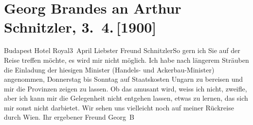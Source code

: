 

         
         \renewcommand{\erwaehntePersonen}{Personen: Georg Brandes, Ignác Darányi, Sandór Hegedüs}
         \renewcommand{\erwaehnteOrte}{Orte: Budapest, Hotel Royal, Ungarn, Wien}
         \renewcommand{\erwaehnteWerke}{}
               \section[Georg Brandes an Arthur Schnitzler, 3. 4. {[}1900{]}]{ Georg Brandes an Arthur Schnitzler, 3. 4. {[}1900{]}}\nopagebreak{}\rehead{ }\begin{ledgroupsized}[t]{13cm}\normalsize\beginnumbering{} \toendnotes[C]{\smallbreak\pagebreak[2]} 
\toendnotes[C]{\smallbreak}\pstart
           \raggedleft{}{\pb}Budapest Hotel Royal3 April\pend
           \pstart
           Liebster Freund Schnitzler\hspace*{2.5em}So gern ich Sie auf der Reise treffen möchte, es
               wird mir nicht möglich. Ich habe nach längerem Sträuben die Einladung der hiesigen
               Minister (Handels- und Ackerbau-Minister) angenommen,
               Donnerstag bis Sonntag auf Staatskosten Ungarn
               zu bereisen und mir die Provinzen zeigen zu lassen. Ob das amusant wird, weiss ich
               nicht, zweifle, aber ich kann mir die Gelegenheit nicht entgehen  lassen, etwas zu lernen, das sich mir sonst nicht
               darbietet.\pend
           \pstart
           Wir sehen uns vielleicht noch auf meiner Rückreise durch Wien.\pend
           \pstart Ihr ergebener Freund \spacefill\mbox{Georg B}\pend{}
         
         \endnumbering{}\end{ledgroupsized}  \newcommand{\dateiname}{L01029}\newcommand{\titel}{Georg Brandes an Arthur Schnitzler, 3. 4. [1900]}\newcommand{\editorInnen}{Martin Anton Müller und Gerd-Hermann Susen}
      